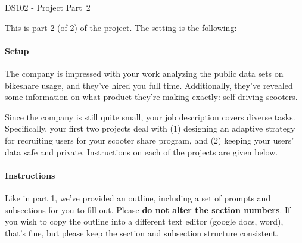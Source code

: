 \documentclass[12pt, answers, addpoints]{exam}
\begin{document}
\begin{center}
    {\Large DS102 - Project Part~2}

    \vspace{0.1in}


    \vspace{0.1in}

\end{center}

This is part 2 (of 2) of the project. The setting is the following:


\paragraph{Setup}
The company is impressed with your work analyzing the public data sets on bikeshare usage, and they've hired you full time. Additionally, they've revealed some information on what product they're making exactly: self-driving scooters.

Since the company is still quite small, your job description covers diverse tasks. Specifically, your first two projects deal with (1) designing an adaptive strategy for recruiting users for your scooter share program, and (2) keeping your users' data safe and private. Instructions on each of the projects are given below. 


\paragraph{Instructions}
Like in part 1, we've provided an outline, including a set of prompts and subsections for you to fill out. Please \textbf{do not alter the section numbers}. If you wish to copy the outline into a different text editor (google docs, word), that's fine, but please keep the section and subsection structure consistent. 
\end{document}
